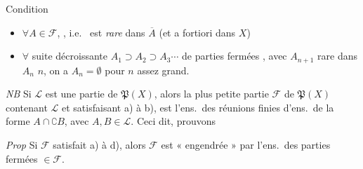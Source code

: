 \documentclass[11pt,a4paper]{article}
\begin{document}
Condition
\begin{itemize}
  \item[d)] $\forall A \in \mathcal{F}$,  , i.e.\ \struck{\ill{}}    est \emph{rare}
  dans $\overline{A}$ (et a fortiori dans $X$)
  \item[e)] \struck{\ill{}} $\forall$ suite décroissante $A_1 \supset A_2
  \supset A_3 \cdots$ de parties fermées 
  , avec $A_{n+1}$ rare dans $A_n$  $n$,
  on a $A_n = \emptyset$ pour $n$ assez grand.
\end{itemize}

\emph{NB} Si $\mathcal{L}$ est une partie de $\mathfrak{P}(X)$, alors la plus
petite partie $\mathcal{F}$ de $\mathfrak{P}(X)$ contenant $\mathcal{L}$ et
satisfaisant a) à b), est
l'ens.\ des réunions finies d'ens.\ de la forme $A \cap \complement B$, avec
$A, B \in \mathcal{L}$. Ceci dit, prouvons

\emph{Prop} Si $\mathcal{F}$ satisfait a) à d), alors $\mathcal{F}$ est
« engendrée » par l'ens.\ des parties fermées $\in \mathcal{F}$.
\end{document}
